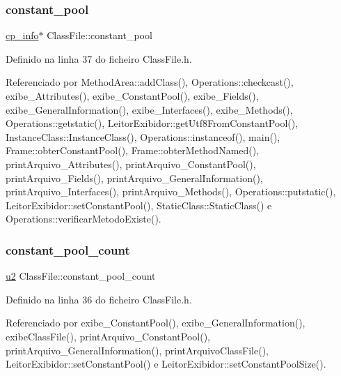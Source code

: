 \subsubsection{\texorpdfstring{constant\+\_\+pool}{constant\_pool}}
{\footnotesize\ttfamily \hyperlink{structcp__info}{cp\+\_\+info}$\ast$ Class\+File\+::constant\+\_\+pool}



Definido na linha 37 do ficheiro Class\+File.\+h.



Referenciado por Method\+Area\+::add\+Class(), Operations\+::checkcast(), exibe\+\_\+\+Attributes(), exibe\+\_\+\+Constant\+Pool(), exibe\+\_\+\+Fields(), exibe\+\_\+\+General\+Information(), exibe\+\_\+\+Interfaces(), exibe\+\_\+\+Methods(), Operations\+::getstatic(), Leitor\+Exibidor\+::get\+Utf8\+From\+Constant\+Pool(), Instance\+Class\+::\+Instance\+Class(), Operations\+::instanceof(), main(), Frame\+::obter\+Constant\+Pool(), Frame\+::obter\+Method\+Named(), print\+Arquivo\+\_\+\+Attributes(), print\+Arquivo\+\_\+\+Constant\+Pool(), print\+Arquivo\+\_\+\+Fields(), print\+Arquivo\+\_\+\+General\+Information(), print\+Arquivo\+\_\+\+Interfaces(), print\+Arquivo\+\_\+\+Methods(), Operations\+::putstatic(), Leitor\+Exibidor\+::set\+Constant\+Pool(), Static\+Class\+::\+Static\+Class() e Operations\+::verificar\+Metodo\+Existe().

\mbox{\label{classClassFile_ac8fdf5cccfd632da4fdb21ae63fffa7a}} 
\subsubsection{\texorpdfstring{constant\+\_\+pool\+\_\+count}{constant\_pool\_count}}
{\footnotesize\ttfamily \hyperlink{BasicTypes_8h_a732cde1300aafb73b0ea6c2558a7a54f}{u2} Class\+File\+::constant\+\_\+pool\+\_\+count}



Definido na linha 36 do ficheiro Class\+File.\+h.



Referenciado por exibe\+\_\+\+Constant\+Pool(), exibe\+\_\+\+General\+Information(), exibe\+Class\+File(), print\+Arquivo\+\_\+\+Constant\+Pool(), print\+Arquivo\+\_\+\+General\+Information(), print\+Arquivo\+Class\+File(), Leitor\+Exibidor\+::set\+Constant\+Pool() e Leitor\+Exibidor\+::set\+Constant\+Pool\+Size().

